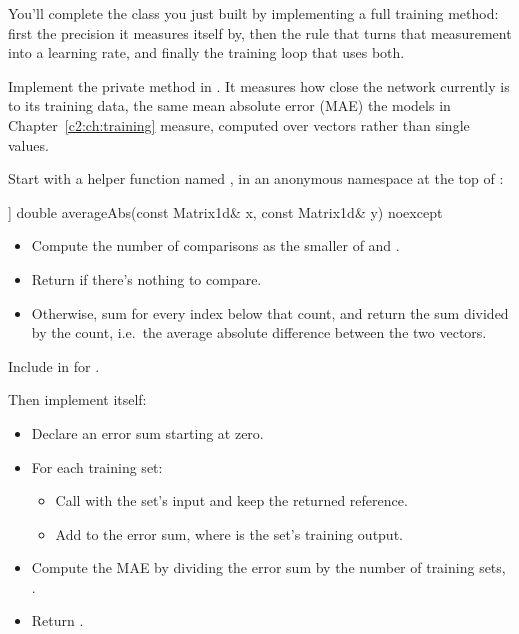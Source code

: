 \label{c4:set:2}
You'll complete the class  you just built by implementing a full
training method: first the precision it measures itself by, then the rule that turns that
measurement into a learning rate, and finally the training loop that uses both.

\label{c4:ex:10}
Implement the private method  in . It
measures how close the network currently is to its training data, the same mean absolute error
(MAE) the models in Chapter~\ref{c2:ch:training} measure, computed over vectors rather than single
values.

Start with a helper function named , in an anonymous namespace at the top of
:

\begin{cppcode}
[[nodiscard]] double averageAbs(const Matrix1d& x, const Matrix1d& y) noexcept
\end{cppcode}

\begin{itemize}
  \item Compute the number of comparisons as the smaller of  and .
  \item Return  if there's nothing to compare.
  \item Otherwise, sum  for every index  below that count, and
    return the sum divided by the count, i.e.\ the average absolute difference between the two
    vectors.
\end{itemize}
Include  in  for .

Then implement  itself:
\begin{itemize}
  \item Declare an error sum starting at zero.
  \item For each training set:
  \begin{itemize}
    \item Call  with the set's input and keep the returned reference.
    \item Add  to the error sum, where  is
      the set's training output.
  \end{itemize}
  \item Compute the MAE by dividing the error sum by the number of training sets,
    .
  \item Return .
\end{itemize}

